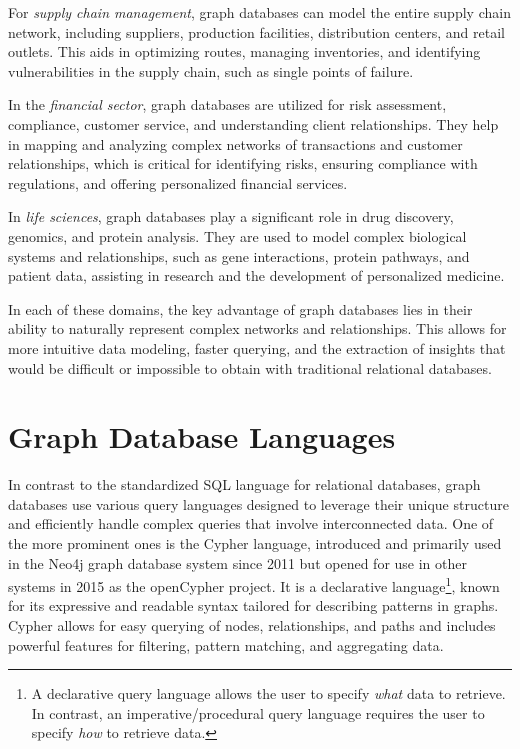 For \emph{supply chain management}, graph databases can model the entire supply chain network, including suppliers, production facilities, distribution centers, and retail outlets. This aids in optimizing routes, managing inventories, and identifying vulnerabilities in the supply chain, such as single points of failure.

In the \emph{financial sector}, graph databases are utilized for risk assessment, compliance, customer service, and understanding client relationships. They help in mapping and analyzing complex networks of transactions and customer relationships, which is critical for identifying risks, ensuring compliance with regulations, and offering personalized financial services.

In \emph{life sciences}, graph databases play a significant role in drug discovery, genomics, and protein analysis. They are used to model complex biological systems and relationships, such as gene interactions, protein pathways, and patient data, assisting in research and the development of personalized medicine.

In each of these domains, the key advantage of graph databases lies in their ability to naturally represent complex networks and relationships. This allows for more intuitive data modeling, faster querying, and the extraction of insights that would be difficult or impossible to obtain with traditional relational databases.

\section{Graph Database Languages}

In contrast to the standardized SQL language for relational databases, graph databases use various query languages designed to leverage their unique structure and efficiently handle complex queries that involve interconnected data. One of the more prominent ones is the Cypher language, introduced and primarily used in the Neo4j graph database system since 2011 but opened for use in other systems in 2015 as the openCypher project. It is a declarative language\footnote{A declarative query language allows the user to specify \emph{what} data to retrieve. In contrast, an imperative/procedural query language requires the user to specify \emph{how} to retrieve data.}, known for its expressive and readable syntax tailored for describing patterns in graphs. Cypher allows for easy querying of nodes, relationships, and paths and includes powerful features for filtering, pattern matching, and aggregating data.

